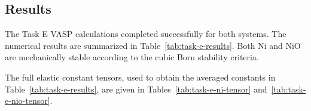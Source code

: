 \subsection{Results}

The Task E VASP calculations completed successfully for both systems.  The
numerical results are summarized in Table~\ref{tab:task-e-results}.  Both Ni
and NiO are mechanically stable according to the cubic Born stability criteria.

\begin{table}[h]
\centering
\caption{Task E mechanical properties derived from elastic tensors.}
\label{tab:task-e-results}
\end{table}

The full elastic constant tensors, used to obtain the averaged constants in
Table~\ref{tab:task-e-results}, are given in
Tables~\ref{tab:task-e-ni-tensor} and~\ref{tab:task-e-nio-tensor}.

\begin{table}[h]
\centering
\caption{Elastic constant tensor for ferromagnetic PBE Ni (GPa).}
\label{tab:task-e-ni-tensor}
\end{table}

